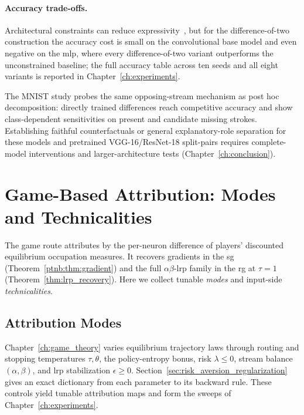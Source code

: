 \paragraph{Accuracy trade-offs.}\label{subsec:dcinn_accuracy}

Architectural constraints can reduce expressivity~\parencite{Sill1997_MonotonicNetworks,Liu2020CertifiedMonotone}, but for the difference-of-two construction the accuracy cost is small on the convolutional base model and even negative on the \ac{mlp}, where every difference-of-two variant outperforms the unconstrained baseline; the full accuracy table across ten seeds and all eight variants is reported in Chapter~\ref{ch:experiments}.

\begin{remark}\label{rem:posthoc_bydesign}
The MNIST study probes the same opposing-stream mechanism as post hoc decomposition: directly trained differences reach competitive accuracy and show class-dependent sensitivities on present and candidate missing strokes. Establishing faithful counterfactuals or general explanatory-role separation for these models and pretrained VGG-16/ResNet-18 split-pairs requires complete-model interventions and larger-architecture tests (Chapter~\ref{ch:conclusion}).
\end{remark}

\section{Game-Based Attribution: Modes and Technicalities}\label{sec:game_based_attribution}

The game route attributes by the per-neuron difference of players' discounted equilibrium occupation measures. It recovers gradients in the \ac{sg} (Theorem~\ref{ptnb:thm:gradient}) and the full $\alpha\beta$-\ac{lrp} family in the \ac{rg} at $\tau=1$ (Theorem~\ref{thm:lrp_recovery}). Here we collect tunable \emph{modes} and input-side \emph{technicalities}.

\subsection{Attribution Modes}\label{subsec:attribution_modes}

Chapter~\ref{ch:game_theory} varies equilibrium trajectory laws through routing and stopping temperatures $\tau,\theta$, the policy-entropy bonus, risk $\lambda\le0$, stream balance $(\alpha,\beta)$, and \ac{lrp} stabilization $\epsilon\ge0$. Section~\ref{sec:risk_aversion_regularization} gives an exact dictionary from each parameter to its backward rule. These controls yield tunable attribution maps and form the sweeps of Chapter~\ref{ch:experiments}.


